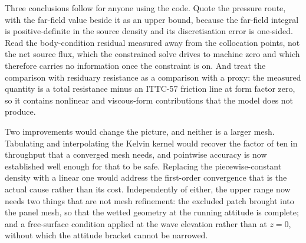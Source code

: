 \documentclass[11pt]{article}
\begin{document}
Three conclusions follow for anyone using the code. Quote the pressure route, with the
far-field value beside it as an upper bound, because the far-field integral is
positive-definite in the source density and its discretisation error is one-sided. Read the
body-condition residual measured away from the collocation points, not the net source flux,
which the constrained solve drives to machine zero and which therefore carries no
information once the constraint is on. And treat the comparison with residuary resistance as
a comparison with a proxy: the measured quantity is a total resistance minus an ITTC-57
friction line at form factor zero, so it contains nonlinear and viscous-form contributions
that the model does not produce.

Two improvements would change the picture, and neither is a larger mesh. Tabulating and
interpolating the Kelvin kernel would recover the factor of ten in throughput that a
converged mesh needs, and pointwise accuracy is now established well enough for that to be
safe. Replacing the piecewise-constant density with a linear one would address the
first-order convergence that is the actual cause rather than its cost. Independently of
either, the upper range now needs two things that are not mesh refinement: the excluded patch
brought into the panel mesh, so that the wetted geometry at the running attitude is complete;
and a free-surface condition applied at the wave elevation rather than at $z = 0$, without
which the attitude bracket cannot be narrowed.
\end{document}

